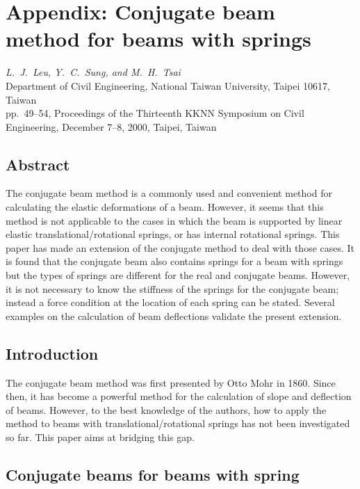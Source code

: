 \clearpage
\section[Appendix: Conjugate beam method for beams with springs (Leu, Sung \& Tsai, 2000)]{Appendix: Conjugate beam method for beams with springs}
\label{sec:conjugate-paper}
\begin{center}
  \emph{L.~J.~Leu, Y.~C.~Sung, and M.~H.~Tsai}\\
  Department of Civil Engineering, National Taiwan University, Taipei 10617, Taiwan\\[2pt]
  {\small pp.~49--54, Proceedings of the Thirteenth KKNN Symposium on Civil Engineering, December 7--8, 2000, Taipei, Taiwan}
\end{center}

\subsection*{Abstract}
The conjugate beam method is a commonly used and convenient method for calculating the elastic deformations of a beam. However, it seems that this method is not applicable to the cases in which the beam is supported by linear elastic translational/rotational springs, or has internal rotational springs. This paper has made an extension of the conjugate method to deal with those cases. It is found that the conjugate beam also contains springs for a beam with springs but the types of springs are different for the real and conjugate beams. However, it is not necessary to know the stiffness of the springs for the conjugate beam; instead a force condition at the location of each spring can be stated. Several examples on the calculation of beam deflections validate the present extension.

\subsection*{Introduction}
The conjugate beam method was first presented by Otto Mohr in 1860. Since then, it has become a powerful method for the calculation of slope and deflection of beams. However, to the best knowledge of the authors, how to apply the method to beams with translational/rotational springs has not been investigated so far. This paper aims at bridging this gap.

\subsection*{Conjugate beams for beams with spring}
